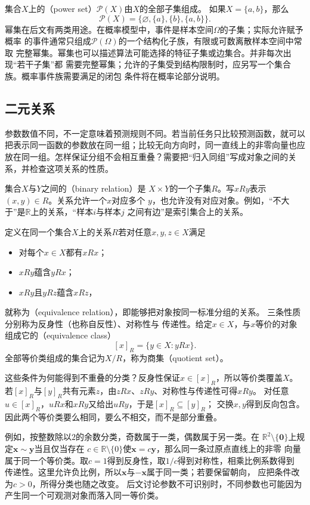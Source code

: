 集合$X$上的（power set）$\mathcal{P}(X)$由$X$的全部子集组成。
如果$X=\{a,b\}$，那么
\[
  \mathcal{P}(X)=\{\varnothing,\{a\},\{b\},\{a,b\}\}.
\]
幂集在后文有两类用途。在概率模型中，事件是样本空间$\Omega$的子集；实际允许赋予概率
的事件通常只组成$\mathcal{P}(\Omega)$的一个结构化子族，有限或可数离散样本空间中常取
完整幂集。幂集也可以描述算法可能选择的特征子集或边集合。并非每次出现“若干子集”都
需要完整幂集；允许的子集受到结构限制时，应另写一个集合族。概率事件族需要满足的闭包
条件将在概率论部分说明。

\subsection{二元关系}
\label{sec:prelim-binary-relations}

参数数值不同，不一定意味着预测规则不同。若当前任务只比较预测函数，就可以把表示同一函数的参数放在同一组；比较无向方向时，同一直线上的非零向量也应放在同一组。怎样保证分组不会相互重叠？需要把“归入同组”写成对象之间的关系，并检查这项关系的性质。

集合$X$与$Y$之间的（binary relation）是
$X\times Y$的一个子集$R$。写$xRy$表示$(x,y)\in R$。关系允许一个$x$对应多个
$y$，也允许没有对应对象。例如，“不大于”是$\mathbb{R}$上的关系，“样本$i$与样本$j$
之间有边”是索引集合上的关系。

\begin{definition}[等价关系与等价类]
\label{def:prelim-equivalence-relation}
定义在同一个集合$X$上的关系$R$若对任意$x,y,z\in X$满足
\begin{itemize}
  \item 对每个$x\in X$都有$xRx$；
  \item $xRy$蕴含$yRx$；
  \item $xRy$且$yRz$蕴含$xRz$，
\end{itemize}
就称为（equivalence relation），即能够把对象按同一标准分组的关系。
三条性质分别称为反身性（也称自反性）、对称性与
传递性。给定$x\in X$，与$x$等价的对象组成它的（equivalence class）
\[
 [x]_R=\{y\in X:yRx\}.
\]
全部等价类组成的集合记为$X/R$，称为商集（quotient set）。
\end{definition}
这些条件为何能得到不重叠的分类？反身性保证$x\in[x]_R$，所以等价类覆盖$X$。
若$[x]_R$与$[y]_R$共有元素$z$，由$zRx$、$zRy$、对称性与传递性可得$xRy$。
对任意$u\in[x]_R$，$uRx$和$xRy$又给出$uRy$，于是$[x]_R\subseteq[y]_R$；
交换$x,y$得到反向包含。因此两个等价类要么相同，要么不相交，而不是部分重叠。

例如，按整数除以$2$的余数分类，奇数属于一类，偶数属于另一类。在
$\mathbb{R}^2\setminus\{\bm{0}\}$上规定$\bm{x}\sim\bm{y}$当且仅当存在
$c\in\mathbb{R}\setminus\{0\}$使$\bm{x}=c\bm{y}$，那么同一条过原点直线上的非零
向量属于同一个等价类。取$c=1$得到反身性，取$1/c$得到对称性，相乘比例系数得到
传递性。这里允许负比例，所以$\bm{x}$与$-\bm{x}$属于同一类；若要保留朝向，
应把条件改为$c>0$，所得分类也随之改变。
后文讨论参数不可识别时，不同参数也可能因为产生同一个可观测对象而落入同一等价类。

